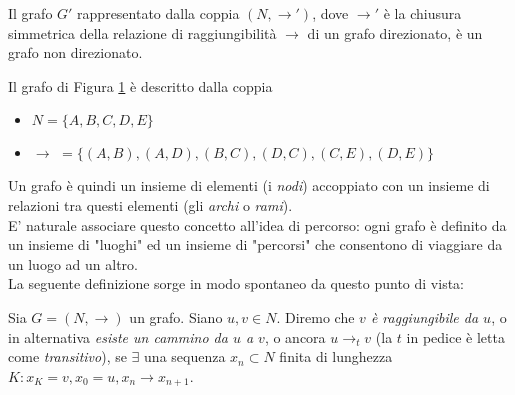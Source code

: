 \begin{observation}
    Il grafo $G'$ rappresentato dalla coppia $(N, \to')$, dove $\to'$ è la chiusura simmetrica della relazione di raggiungibilità $\to$ di un grafo direzionato,
    è un grafo non direzionato.
\end{observation}
\begin{example}
    \begin{figure}[t]
        \centering
        \caption{}
        \label{fig:graph}
    \end{figure}
    Il grafo di Figura \ref*{fig:graph} è descritto dalla coppia
    \begin{itemize}
        \item $N = \{A,B,C,D,E\}$
        \item $\to \,\,= \{(A,B), (A,D), (B,C), (D,C), (C,E), (D,E)\}$
    \end{itemize}
\end{example}
Un grafo è quindi un insieme di elementi (i \textit{nodi}) accoppiato con un insieme di relazioni tra questi elementi (gli \textit{archi} o \textit{rami}).\\
E' naturale associare questo concetto all'idea di percorso: ogni grafo è definito da un insieme di "luoghi" ed un insieme di "percorsi" che consentono di viaggiare
da un luogo ad un altro.\\
La seguente definizione sorge in modo spontaneo da questo punto di vista:
\begin{definition}
    Sia $G = (N, \to)$ un grafo. Siano $u,v \in N$. Diremo che \textit{$v$ è raggiungibile da $u$}, o in alternativa \textit{esiste un cammino da $u$ a $v$}, o ancora $u \to_t v$ (la $t$ in pedice è letta come \textit{transitivo}), se
    $\exists$ una sequenza $x_n \subset N$ finita di lunghezza $K : x_K = v, x_0 = u, x_n \to x_{n+1}$.
\end{definition}
